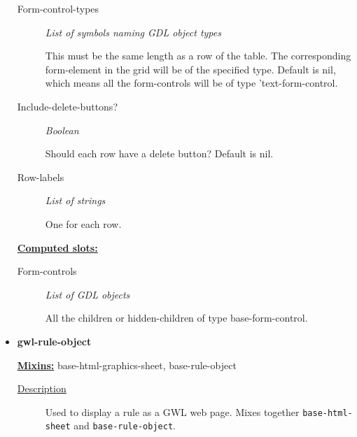 \documentclass [11pt]{book}
\begin{document}
\begin{itemize}
\begin{description}
\item [Form-control-types]
\emph{List of symbols naming GDL object types}

 This must be
the same length as a row of the table. The corresponding
form-element in the grid will be of the specified type.
Default is nil, which means all the form-controls will
be of type 'text-form-control.




\item [Include-delete-buttons?]
\emph{Boolean}

 Should each row have a delete button?
Default is nil.




\item [Row-labels]
\emph{List of strings}

 One for each row.




\end{description}






\textbf{
\underline{Computed slots:}}

\begin{description}

\item [Form-controls]
\emph{List of GDL objects}

 All the children or hidden-children
of type base-form-control.




\end{description}







\item {}
\label{prim:gwl-rule-object}
\textbf{gwl-rule-object}


\textbf{
\underline{Mixins:}} base-html-graphics-sheet, base-rule-object





\begin{description}

\item [
\underline{Description}]


Used to display a rule as a GWL web page. 
Mixes together \texttt{base-html-sheet} and \texttt{base-rule-object}.




\end{description}
\end{itemize}
\end{document}
